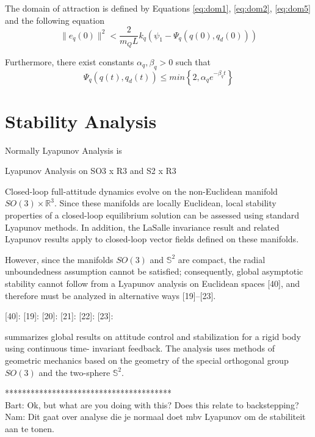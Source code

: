 The domain of attraction is defined by Equations \ref{eq:dom1}, \ref{eq:dom2}, \ref{eq:dom5} and the following equation
\begin{equation}
\parallel e_{\dot{q}}(0)\parallel^2<\frac{2}{m_QL}{k_q}(\psi_1-\Psi_q(q(0),q_d(0)))
\end{equation}


Furthermore, there exist constants $ \alpha_q,\beta_q>0 $ such that
\begin{equation}\label{key}
\Psi_q(q(t),q_d(t)) \leq min\left\lbrace 2,\alpha_qe^{-\beta_qt}\right\rbrace 
\end{equation}

\section{Stability Analysis}\label{sec:con.sta}

Normally Lyapunov Analysis is 


Lyapunov Analysis on SO3 x R3 and S2 x R3

Closed-loop full-attitude dynamics evolve on the non-Euclidean manifold $ SO(3) \times \mathbb{R}^3 $. 
Since these manifolds are locally Euclidean, local stability properties of a closed-loop equilibrium solution can be assessed using standard Lyapunov methods. In addition, the LaSalle invariance result and related Lyapunov results apply to closed-loop vector fields defined on these manifolds. 

However, since the manifolds $ SO(3) $ and $ \mathbb{S}^2 $ are compact, the radial unboundedness assumption cannot be satisfied; consequently, global asymptotic stability cannot follow from a Lyapunov analysis on Euclidean spaces [40], and therefore must be analyzed in alternative ways [19]–[23].\cite[p.43]{Chaturvedi2011}

[40]:
[19]:
[20]:
[21]:
[22]:
[23]:


\cite{Chaturvedi2011} summarizes global results on attitude control and stabilization for a rigid body using continuous time- invariant feedback. The analysis uses methods of geometric mechanics based on the geometry of the special orthogonal group $ SO(3) $ and the two-sphere $ \mathbb{S}^2 $.


***************************************\\
Bart: Ok, but what are you doing with this? Does this relate to backstepping?\\
Nam: Dit gaat over analyse die je normaal doet mbv Lyapunov om de stabiliteit aan te tonen. 

